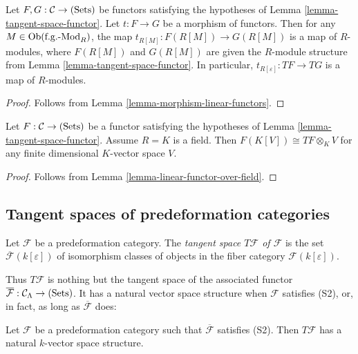 \begin{lemma}
\label{lemma-morphism-tangent-spaces}
Let $F, G: \mathcal C \rightarrow \textnormal{(Sets)}$ be functors satisfying 
the hypotheses of Lemma \ref{lemma-tangent-space-functor}.  Let $t: F 
\rightarrow G$ be a morphism of functors.  Then for any $M \in 
\textnormal{Ob}(\textnormal{f.g.-Mod}_{R})$, the map $t_{R[M]}: F(R[M]) 
\rightarrow G(R[M])$ is a map of $R$-modules, where $F(R[M])$ and $G(R[M])$ are 
given the $R$-module structure from Lemma \ref{lemma-tangent-space-functor}.  
In particular, $t_{R[\varepsilon]} : TF \rightarrow TG$ is a map of $R$-modules.
\end{lemma}

\begin{proof}
Follows from Lemma \ref{lemma-morphism-linear-functors}.
\end{proof}

\begin{lemma}
\label{lemma-tangent-space-tensor}
Let $F: \mathcal C \rightarrow \textnormal{(Sets)}$ be a functor satisfying the 
hypotheses of Lemma \ref{lemma-tangent-space-functor}.  Assume $R = K$ is a 
field.  Then $F(K[V]) \cong TF \otimes_{K} V$ for any finite dimensional 
$K$-vector space $V$.
\end{lemma}

\begin{proof}
Follows from Lemma \ref{lemma-linear-functor-over-field}.
\end{proof}

\subsection{Tangent spaces of predeformation categories}
\label{subsection-tangent-spaces}

\begin{definition}
\label{definition-tangent-space}
Let $\mathcal F$ be a predeformation category.  The {\it tangent space $T 
\mathcal F$ of $\mathcal F$} is the set $\overline{\mathcal F}(k[\varepsilon])$ 
of isomorphism classes of objects in the fiber category $\mathcal 
F(k[\varepsilon])$.
\end{definition}

\noindent
Thus $T \mathcal F$ is nothing but the tangent space of the associated functor 
$\overline{\mathcal F}: \mathcal{C}_{\Lambda} \rightarrow \textnormal{(Sets)}$. 
It has a natural vector space structure when $\mathcal F$ satisfies (S2), or, 
in fact, as long as $\overline{\mathcal F}$ does:
\begin{lemma}
\label{lemma-tangent-space-vector-space}
Let $\mathcal F$ be a predeformation category such that $\overline{\mathcal F}$ 
satisfies \textnormal{(S2)}. Then $T \mathcal F$ has a natural $k$-vector space 
structure.
\end{lemma}

